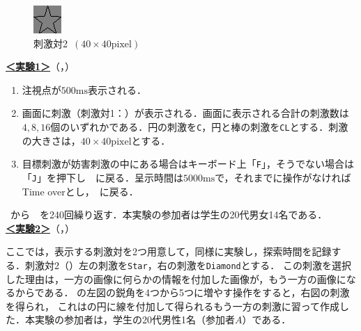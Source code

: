 \begin{figure}
\begin{minipage}[t]{.13\textwidth}
        \includegraphics[keepaspectratio,width=\textwidth]{../../13_BehavioralExperiment/star.png}
    \end{minipage}
    \caption{刺激対2\ \((40\times 40\textrm{pixel})\)}
    \label{fig:刺激対2}
    \vspace{-1cm}
\end{figure}
\noindent\textbf{\underline{＜実験1＞}}（，）
\begin{enumerate}
    \renewcommand{\labelenumi}{\fbox{\theenumi}}
    \item 注視点が\(500\textrm{ms}\)表示される．
    \item 画面に刺激（刺激対1：）が表示される．画面に表示される合計の刺激数は\(4,8,16\)個のいずれかである．円の刺激を\texttt{C}，円と棒の刺激を\texttt{CL}とする．刺激の大きさは，\(40\times40\textrm{pixel}\)とする．
    \item 目標刺激が妨害刺激の中にある場合はキーボード上「\texttt{F}」，そうでない場合は「\texttt{J}」を押下し\ \ に戻る．呈示時間は\(5000\textrm{ms}\)で，それまでに操作がなければTime overとし，\ に戻る．
\end{enumerate}
\ から\ \ を240回繰り返す．本実験の参加者は学生の20代男女14名である．\\
\textbf{\underline{＜実験2＞}}（，）\par
ここでは，表示する刺激対を2つ用意して，同様に実験し，探索時間を記録する．刺激対2（）左の刺激を\texttt{Star}，右の刺激を\texttt{Diamond}とする．
この刺激を選択した理由は，一方の画像に何らかの情報を付加した画像が，もう一方の画像になるからである．
の左図の鋭角を4つから5つに増やす操作をすると，右図の刺激を得られ，
これはの円に線を付加して得られるもう一方の刺激に習って作成した．本実験の参加者は，学生の20代男性1名（参加者\(A\)）である．
